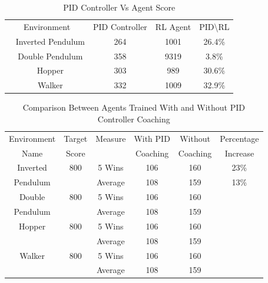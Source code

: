 \documentclass[journal]{IEEEtran}
\begin{document}

\begin{table}
\footnotesize
\caption{PID Controller Vs Agent Score}
\label{score}
\centering
\begin{tabular}{ cccc }
\hline
\rowcolor{airforceblue}
Environment &   PID Controller &RL Agent &PID\textbackslash RL \\
\hhline~
\rowcolor{beaublue}
Inverted Pendulum &  264 & 1001& \cellcolor{lightgray}26.4\%\\
\hhline~
Double Pendulum &  358 & 9319&\cellcolor{lightgray}3.8\%\\
\hhline~
\rowcolor{beaublue}
Hopper &  303 & 989&\cellcolor{lightgray}30.6\%\\
\hhline~
Walker &  332 & 1009&\cellcolor{lightgray}32.9\%\\
\hline
\end{tabular}
\end{table}


\begin{table}
\scriptsize

\caption{Comparison Between Agents Trained With and Without PID Controller Coaching}
\label{table_example}
\centering
\begin{tabular}{ cccccc }
\hline
\rowcolor{airforceblue}

Environment & Target & Measure  &  With PID  & Without  & Percentage\\
\rowcolor{airforceblue}

   Name     & Score  &              & Coaching  & Coaching  & Increase \\
\hline


Inverted & 800& 5 Wins & 106 & 160& 23\% \\
Pendulum & &Average  & 108 &  159& 13\%\\
\hline
Double & 800& 5 Wins & 106 & 160\\
Pendulum & &Average & 108 &  159\\
\hline
Hopper & 800& 5 Wins & 106 & 160\\
       & &Average  & 108 &  159\\
\hline
Walker & 800& 5 Wins & 106 & 160\\
       & &Average  & 108 &  159\\
\hline

\end{tabular}
\end{table}
\end{document}
